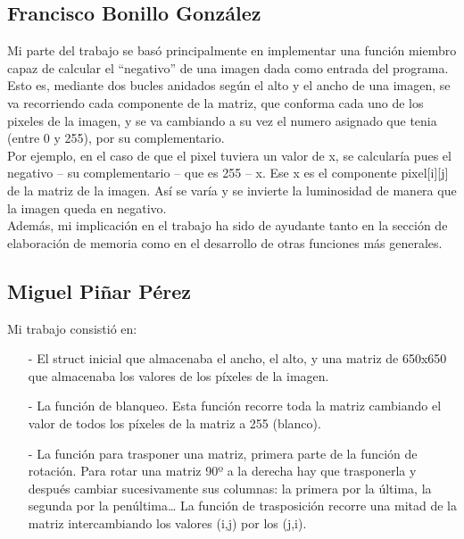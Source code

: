 \documentclass[a4paper, 11pt, spanish]{article}
\begin{document}
\subsection{Francisco Bonillo González}

Mi parte del trabajo se basó principalmente en implementar una función miembro capaz de calcular el “negativo” de una imagen dada como entrada del programa.
\\

Esto es, mediante dos bucles anidados según el alto y el ancho de una imagen, se va recorriendo cada componente de la matriz, que conforma cada uno de los pixeles de la imagen, y se va cambiando a su vez el numero asignado que tenia (entre 0 y 255), por su complementario.
\\

Por ejemplo, en el caso de que el pixel tuviera un valor de x, se calcularía pues el negativo – su complementario – que es 255 – x. Ese x es el componente pixel[i][j] de la matriz de la imagen. Así se varía y se invierte la luminosidad de manera que la imagen queda en negativo.
\\

Además, mi implicación en el trabajo ha sido de ayudante tanto en la sección de elaboración de memoria como en el desarrollo de otras funciones más generales.

\subsection{Miguel Piñar Pérez}

Mi trabajo consistió en:

\begin{itemize}

\item[-] El struct inicial que almacenaba el ancho, el alto, y una matriz de 650x650 que almacenaba los valores de los píxeles de la imagen.

\item[-] La función de blanqueo. Esta función recorre toda la matriz cambiando el valor de todos los píxeles de la matriz a 255 (blanco).

\item[-] La función para trasponer una matriz, primera parte de la función de rotación. Para rotar una matriz 90º a la derecha hay que trasponerla y después cambiar sucesivamente sus columnas: la primera por la última, la segunda por la penúltima… La función de trasposición recorre una mitad de la matriz intercambiando los valores (i,j) por los (j,i).

\end{itemize}
\end{document}
